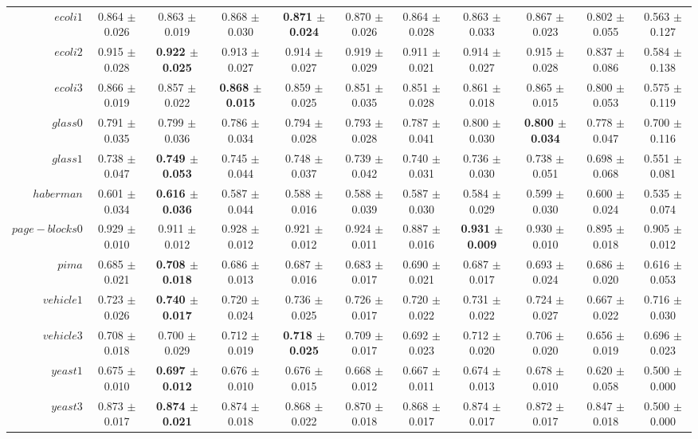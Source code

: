 \begin{table}[!ht]
{\begin{tabular}{r c c c c c c c c c c}
$ecoli1$ & 0.864 $\pm$ 0.026 & 0.863 $\pm$ 0.019 & 0.868 $\pm$ 0.030 & \textbf{0.871 $\pm$ 0.024} & 0.870 $\pm$ 0.026 & 0.864 $\pm$ 0.028 & 0.863 $\pm$ 0.033 & 0.867 $\pm$ 0.023 & 0.802 $\pm$ 0.055 & 0.563 $\pm$ 0.127 \\
$ecoli2$ & 0.915 $\pm$ 0.028 & \textbf{0.922 $\pm$ 0.025} & 0.913 $\pm$ 0.027 & 0.914 $\pm$ 0.027 & 0.919 $\pm$ 0.029 & 0.911 $\pm$ 0.021 & 0.914 $\pm$ 0.027 & 0.915 $\pm$ 0.028 & 0.837 $\pm$ 0.086 & 0.584 $\pm$ 0.138 \\
$ecoli3$ & 0.866 $\pm$ 0.019 & 0.857 $\pm$ 0.022 & \textbf{0.868 $\pm$ 0.015} & 0.859 $\pm$ 0.025 & 0.851 $\pm$ 0.035 & 0.851 $\pm$ 0.028 & 0.861 $\pm$ 0.018 & 0.865 $\pm$ 0.015 & 0.800 $\pm$ 0.053 & 0.575 $\pm$ 0.119 \\
$glass0$ & 0.791 $\pm$ 0.035 & 0.799 $\pm$ 0.036 & 0.786 $\pm$ 0.034 & 0.794 $\pm$ 0.028 & 0.793 $\pm$ 0.028 & 0.787 $\pm$ 0.041 & 0.800 $\pm$ 0.030 & \textbf{0.800 $\pm$ 0.034} & 0.778 $\pm$ 0.047 & 0.700 $\pm$ 0.116 \\
$glass1$ & 0.738 $\pm$ 0.047 & \textbf{0.749 $\pm$ 0.053} & 0.745 $\pm$ 0.044 & 0.748 $\pm$ 0.037 & 0.739 $\pm$ 0.042 & 0.740 $\pm$ 0.031 & 0.736 $\pm$ 0.030 & 0.738 $\pm$ 0.051 & 0.698 $\pm$ 0.068 & 0.551 $\pm$ 0.081 \\
$haberman$ & 0.601 $\pm$ 0.034 & \textbf{0.616 $\pm$ 0.036} & 0.587 $\pm$ 0.044 & 0.588 $\pm$ 0.016 & 0.588 $\pm$ 0.039 & 0.587 $\pm$ 0.030 & 0.584 $\pm$ 0.029 & 0.599 $\pm$ 0.030 & 0.600 $\pm$ 0.024 & 0.535 $\pm$ 0.074 \\
$page-blocks0$ & 0.929 $\pm$ 0.010 & 0.911 $\pm$ 0.012 & 0.928 $\pm$ 0.012 & 0.921 $\pm$ 0.012 & 0.924 $\pm$ 0.011 & 0.887 $\pm$ 0.016 & \textbf{0.931 $\pm$ 0.009} & 0.930 $\pm$ 0.010 & 0.895 $\pm$ 0.018 & 0.905 $\pm$ 0.012 \\
$pima$ & 0.685 $\pm$ 0.021 & \textbf{0.708 $\pm$ 0.018} & 0.686 $\pm$ 0.013 & 0.687 $\pm$ 0.016 & 0.683 $\pm$ 0.017 & 0.690 $\pm$ 0.021 & 0.687 $\pm$ 0.017 & 0.693 $\pm$ 0.024 & 0.686 $\pm$ 0.020 & 0.616 $\pm$ 0.053 \\
$vehicle1$ & 0.723 $\pm$ 0.026 & \textbf{0.740 $\pm$ 0.017} & 0.720 $\pm$ 0.024 & 0.736 $\pm$ 0.025 & 0.726 $\pm$ 0.017 & 0.720 $\pm$ 0.022 & 0.731 $\pm$ 0.022 & 0.724 $\pm$ 0.027 & 0.667 $\pm$ 0.022 & 0.716 $\pm$ 0.030 \\
$vehicle3$ & 0.708 $\pm$ 0.018 & 0.700 $\pm$ 0.029 & 0.712 $\pm$ 0.019 & \textbf{0.718 $\pm$ 0.025} & 0.709 $\pm$ 0.017 & 0.692 $\pm$ 0.023 & 0.712 $\pm$ 0.020 & 0.706 $\pm$ 0.020 & 0.656 $\pm$ 0.019 & 0.696 $\pm$ 0.023 \\
$yeast1$ & 0.675 $\pm$ 0.010 & \textbf{0.697 $\pm$ 0.012} & 0.676 $\pm$ 0.010 & 0.676 $\pm$ 0.015 & 0.668 $\pm$ 0.012 & 0.667 $\pm$ 0.011 & 0.674 $\pm$ 0.013 & 0.678 $\pm$ 0.010 & 0.620 $\pm$ 0.058 & 0.500 $\pm$ 0.000 \\
$yeast3$ & 0.873 $\pm$ 0.017 & \textbf{0.874 $\pm$ 0.021} & 0.874 $\pm$ 0.018 & 0.868 $\pm$ 0.022 & 0.870 $\pm$ 0.018 & 0.868 $\pm$ 0.017 & 0.874 $\pm$ 0.017 & 0.872 $\pm$ 0.017 & 0.847 $\pm$ 0.018 & 0.500 $\pm$ 0.000 \\
\end{tabular}}
\end{table}
